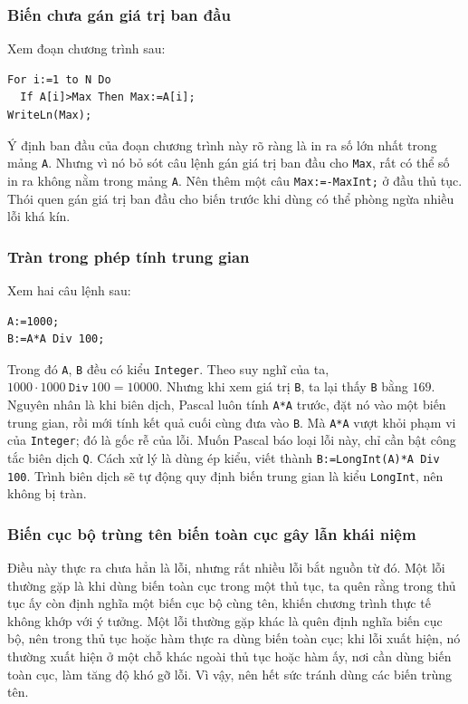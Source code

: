 \documentclass[11pt]{article}
\begin{document}
\subsubsection{Biến chưa gán giá trị ban đầu}

Xem đoạn chương trình sau:
\begin{verbatim}
For i:=1 to N Do
  If A[i]>Max Then Max:=A[i];
WriteLn(Max);
\end{verbatim}
Ý định ban đầu của đoạn chương trình này rõ ràng là in ra số lớn nhất trong
mảng \texttt{A}. Nhưng vì nó bỏ sót câu lệnh gán giá trị ban đầu cho
\texttt{Max}, rất có thể số in ra không nằm trong mảng \texttt{A}. Nên thêm
một câu \texttt{Max:=-MaxInt;} ở đầu thủ tục. Thói quen gán giá trị ban đầu
cho biến trước khi dùng có thể phòng ngừa nhiều lỗi khá kín.

\subsubsection{Tràn trong phép tính trung gian}

Xem hai câu lệnh sau:
\begin{verbatim}
A:=1000;
B:=A*A Div 100;
\end{verbatim}
Trong đó \texttt{A}, \texttt{B} đều có kiểu \texttt{Integer}. Theo suy nghĩ
của ta, \(1000\cdot1000\ \texttt{Div}\ 100=10000\). Nhưng khi xem giá trị
\texttt{B}, ta lại thấy \texttt{B} bằng \(169\). Nguyên nhân là khi biên dịch,
Pascal luôn tính \texttt{A*A} trước, đặt nó vào một biến trung gian, rồi mới
tính kết quả cuối cùng đưa vào \texttt{B}. Mà \texttt{A*A} vượt khỏi phạm vi
của \texttt{Integer}; đó là gốc rễ của lỗi. Muốn Pascal báo loại lỗi này, chỉ
cần bật công tắc biên dịch \texttt{Q}. Cách xử lý là dùng ép kiểu, viết thành
\texttt{B:=LongInt(A)*A Div 100}. Trình biên dịch sẽ tự động quy định biến
trung gian là kiểu \texttt{LongInt}, nên không bị tràn.

\subsubsection{Biến cục bộ trùng tên biến toàn cục gây lẫn khái niệm}

Điều này thực ra chưa hẳn là lỗi, nhưng rất nhiều lỗi bắt nguồn từ đó. Một lỗi
thường gặp là khi dùng biến toàn cục trong một thủ tục, ta quên rằng trong
thủ tục ấy còn định nghĩa một biến cục bộ cùng tên, khiến chương trình thực
tế không khớp với ý tưởng. Một lỗi thường gặp khác là quên định nghĩa biến
cục bộ, nên trong thủ tục hoặc hàm thực ra dùng biến toàn cục; khi lỗi xuất
hiện, nó thường xuất hiện ở một chỗ khác ngoài thủ tục hoặc hàm ấy, nơi cần
dùng biến toàn cục, làm tăng độ khó gỡ lỗi. Vì vậy, nên hết sức tránh dùng
các biến trùng tên.
\end{document}

